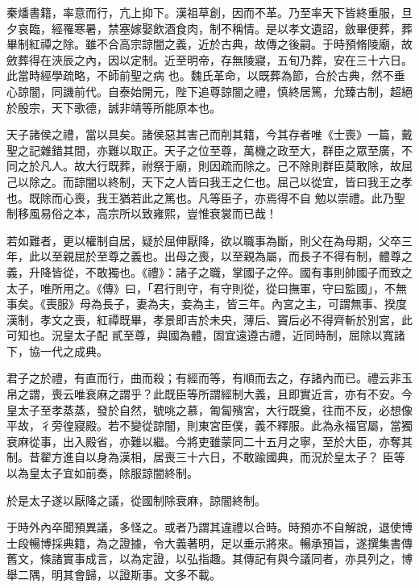 \begin{pinyinscope}
 秦燔書籍，率意而行，亢上抑下。漢祖草創，因而不革。乃至率天下皆終重服，旦夕哀臨，經罹寒暑，禁塞嫁娶飲酒食肉，制不稱情。是以孝文遺詔，斂畢便葬，葬畢制紅禫之除。雖不合高宗諒闇之義，近於古典，故傳之後嗣。于時預脩陵廟，故斂葬得在浹辰之內，因以定制。近至明帝，存無陵寢，五旬乃葬，安在三十六日。此當時經學疏略，不師前聖之病
 也。魏氏革命，以既葬為節，合於古典，然不垂心諒闇，同譏前代。自泰始開元，陛下追尊諒闇之禮，慎終居篤，允臻古制，超絕於殷宗，天下歌德，誠非靖等所能原本也。



 天子諸侯之禮，當以具矣。諸侯惡其害己而削其籍，今其存者唯《士喪》一篇，戴聖之記雜錯其間，亦難以取正。天子之位至尊，萬機之政至大，群臣之眾至廣，不同之於凡人。故大行既葬，祔祭于廟，則因疏而除之。己不除則群臣莫敢除，故屈己以除之。而諒闇以終制，天下之人皆曰我王之仁也。屈己以從宜，皆曰我王之孝也。既除而心喪，我王猶若此之篤也。凡等臣子，亦焉得不自
 勉以崇禮。此乃聖制移風易俗之本，高宗所以致雍熙，豈惟衰裳而已哉！



 若如難者，更以權制自居，疑於屈伸厭降，欲以職事為斷，則父在為母期，父卒三年，此以至親屈於至尊之義也。出母之喪，以至親為屬，而長子不得有制，體尊之義，升降皆從，不敢獨也。《禮》：諸子之職，掌國子之倅。國有事則帥國子而致之太子，唯所用之。《傳》曰，「君行則守，有守則從，從曰撫軍，守曰監國」，不無事矣。《喪服》母為長子，妻為夫，妾為主，皆三年。內宮之主，可謂無事、揆度漢制，孝文之喪，紅禫既畢，孝景即吉於未央，薄后、竇后必不得齊斬於別宮，此可知也。況皇太子配
 貳至尊，與國為體，固宜遠遵古禮，近同時制，屈除以寬諸下，協一代之成典。



 君子之於禮，有直而行，曲而殺；有經而等，有順而去之，存諸內而已。禮云非玉帛之謂，喪云唯衰麻之謂乎？此既臣等所謂經制大義，且即實近言，亦有不安。今皇太子至孝蒸蒸，發於自然，號咷之慕，匍匐殯宮，大行既奠，往而不反，必想像平故，彳旁徨寢殿。若不變從諒闇，則東宮臣僕，義不釋服。此為永福官屬，當獨衰麻從事，出入殿省，亦難以繼。今將吏雖蒙同二十五月之寧，至於大臣，亦奪其制。昔翟方進自以身為漢相，居喪三十六日，不敢踰國典，而況於皇太子？
 臣等以為皇太子宜如前奏，除服諒闇終制。



 於是太子遂以厭降之議，從國制除衰麻，諒闇終制。



 于時外內卒聞預異議，多怪之。或者乃謂其違禮以合時。時預亦不自解說，退使博士段暢博採典籍，為之證據，令大義著明，足以垂示將來。暢承預旨，遂撰集書傳舊文，條諸實事成言，以為定證，以弘指趣。其傳記有與今議同者，亦具列之，博舉二隅，明其會歸，以證斯事。文多不載。




\end{pinyinscope}
